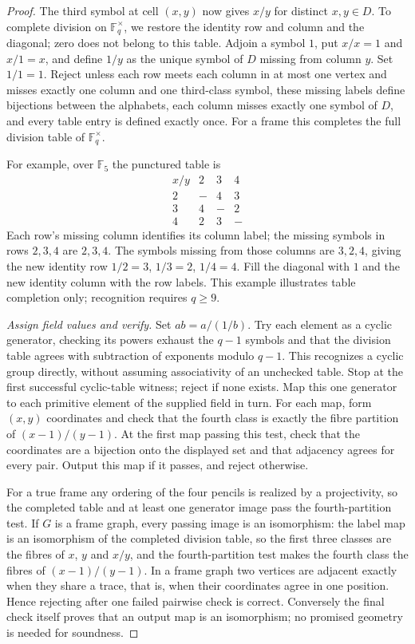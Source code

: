\documentclass[11pt]{article}
\theoremstyle{definition}
\theoremstyle{remark}
\newcommand{\F}{\mathbb F}
\begin{document}
\begin{proof}
The third symbol at cell $(x,y)$ now gives $x/y$ for distinct $x,y\in D$.
To complete division on $\F_q^\times$, we restore the identity row and column
and the diagonal; zero does not belong to this table.
Adjoin a symbol $1$, put $x/x=1$ and $x/1=x$, and define $1/y$ as the
unique symbol of $D$ missing from column $y$. Set $1/1=1$. Reject
unless each row meets each column in at most one vertex and misses
exactly one column and one third-class symbol, these missing labels
define bijections between the alphabets, each column misses exactly one
symbol of $D$, and every table entry is defined exactly once. For a
frame this completes the full division table of $\F_q^\times$.

For example, over $\F_5$ the punctured table is
\[
\begin{array}{c|ccc}
 x/y&2&3&4\\\hline
 2&-&4&3\\
 3&4&-&2\\
 4&2&3&-
\end{array}
\]
Each row's missing column identifies its column label; the missing symbols
in rows $2,3,4$ are $2,3,4$. The symbols missing from those columns are
$3,2,4$, giving the new identity row $1/2=3$, $1/3=2$, $1/4=4$.
Fill the diagonal with $1$ and the new identity column with the row labels.
This example illustrates table completion only; recognition requires $q\ge9$.

\emph{Assign field values and verify.}
Set $ab=a/(1/b)$. Try each element as a cyclic generator, checking its
powers exhaust the $q-1$ symbols and that the division table agrees
with subtraction of exponents modulo $q-1$. This recognizes a cyclic
group directly, without assuming associativity of an unchecked table.
Stop at the first successful cyclic-table witness; reject if none exists.
Map this one generator to each primitive element of the supplied field in turn.
For each map, form $(x,y)$ coordinates and check that the fourth class
is exactly the fibre partition of $(x-1)/(y-1)$. At the first map passing
this test, check that the coordinates are a bijection onto the displayed
set and that adjacency agrees for every pair. Output this map if it
passes, and reject otherwise.

For a true frame any ordering of the four pencils is realized by a
projectivity, so the completed table and at least one generator image
pass the fourth-partition test. If $G$ is a frame graph, every passing
image is an isomorphism: the label map is an isomorphism of the completed division table, so the
first three classes are the fibres of $x$, $y$ and $x/y$, and the
fourth-partition test makes the fourth class the fibres of
$(x-1)/(y-1)$. In a frame graph two vertices are adjacent exactly when
they share a trace, that is, when their coordinates agree in one
position. Hence rejecting after one failed pairwise check is correct.
Conversely the final check itself proves that an output map is an
isomorphism; no promised geometry is needed for soundness.


\end{proof}
\end{document}
